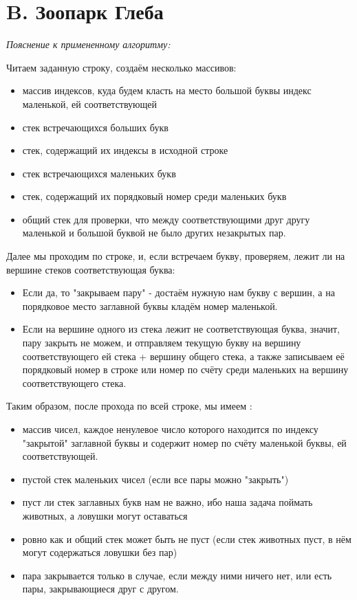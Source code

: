 \section{B. Зоопарк Глеба}
\textit{Пояснение к примененному алгоритму:} \par
Читаем заданную строку, создаём несколько массивов:
\begin{itemize}
    \item массив индексов, куда будем класть на место большой буквы индекс маленькой, ей соответствующей
    \item стек встречающихся больших букв
    \item стек, содержащий их индексы в исходной строке
    \item стек встречающихся маленьких букв
    \item стек, содержащий их порядковый номер среди маленьких букв
    \item общий стек для проверки, что между соответствующими друг другу маленькой и большой буквой не было других незакрытых пар.
\end{itemize}
Далее мы проходим по строке, и, если встречаем букву, проверяем, лежит ли на вершине стеков соответствующая буква:
\begin{itemize}
    \item Если да, то "закрываем пару" - достаём нужную нам букву с вершин, а на порядковое место заглавной буквы кладём номер маленькой.
    \item Если на вершине одного из стека лежит не соответствующая буква, значит, пару закрыть не можем, и отправляем текущую букву на вершину соответствующего ей стека + вершину общего стека, а также записываем её порядковый номер в строке или номер по счёту среди маленьких на вершину соответствующего стека.
\end{itemize}
Таким образом, после прохода по всей строке, мы имеем :
\begin{itemize}
    \item[\ding{51}] массив чисел, каждое ненулевое число которого находится по индексу "закрытой" заглавной буквы и содержит номер по счёту маленькой буквы, ей соответствующей.
    \item[\ding{51}] пустой стек маленьких чисел (если все пары можно "закрыть")
    \item[\ding{43}] пуст ли стек заглавных букв нам не важно, ибо наша задача поймать животных, а ловушки могут оставаться
    \item[\ding{43}] ровно как и общий стек может быть не пуст (если стек животных пуст, в нём могут содержаться ловушки без пар)
    \item[\ding{43}] пара закрывается только в случае, если между ними ничего нет, или есть пары, закрывающиеся друг с другом.
\end{itemize}
